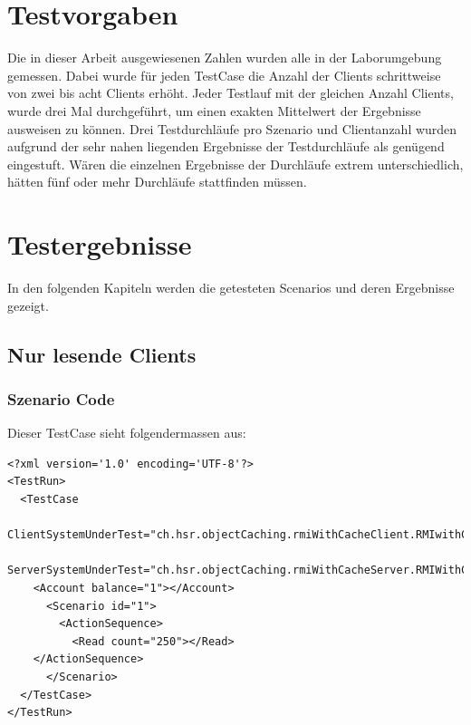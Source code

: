 \section{Testvorgaben}
Die in dieser Arbeit ausgewiesenen Zahlen wurden alle in der La\-bor\-um\-gebung ge\-mes\-sen. Dabei wurde für jeden Test\-Case die An\-zahl der Clients schritt\-weise von zwei bis acht Clients erhöht. Jeder Test\-lauf mit der gleichen Anzahl Clients, wurde drei Mal durchgeführt, um einen exakten Mittel\-wert der Er\-geb\-nis\-se aus\-weisen zu können. Drei Test\-durchläufe pro Szenario und Clientanzahl wurden aufgrund der sehr nahen liegenden Er\-geb\-nis\-se der Testdurchläufe als genügend eingestuft. Wären die einzelnen Ergebnisse der Durchläufe extrem unterschiedlich, hätten fünf oder mehr Durchläufe stattfinden müssen.

\section{Testergebnisse}
In den folgenden Kapiteln werden die getesteten Scenarios und deren Ergebnisse gezeigt. 

\subsection{Nur lesende Clients}
\subsubsection{Szenario Code}
Dieser TestCase sieht folgendermassen aus:
\begin{lstlisting}[breaklines=true]
<?xml version='1.0' encoding='UTF-8'?>
<TestRun>
  <TestCase
    ClientSystemUnderTest="ch.hsr.objectCaching.rmiWithCacheClient.RMIwithCacheClientSystem"
    ServerSystemUnderTest="ch.hsr.objectCaching.rmiWithCacheServer.RMIWithCacheServerSystem">
    <Account balance="1"></Account>
      <Scenario id="1">
        <ActionSequence>
          <Read count="250"></Read>
	</ActionSequence>
      </Scenario>
  </TestCase>
</TestRun>
\end{lstlisting}

